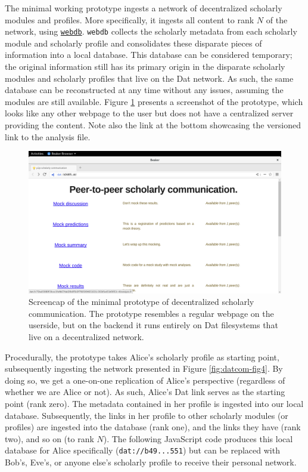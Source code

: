 \documentclass[publications,article,submit,moreauthors,pdftex,10pt,a4paper]{Definitions/mdpi}
\begin{document}
The minimal working prototype ingests a network of decentralized
scholarly modules and profiles. More specifically, it ingests all
content to rank \(N\) of the network, using
\href{https://github.com/beakerbrowser/webdb}{\texttt{webdb}}.
\texttt{webdb} collects the scholarly metadata from each scholarly
module and scholarly profile and consolidates these disparate pieces of
information into a local database. This database can be considered
temporary; the original information still has its primary origin in the
disparate scholarly modules and scholarly profiles that live on the Dat
network. As such, the same database can be reconstructed at any time
without any issues, assuming the modules are still available. Figure
\ref{fig:datcom-fig5} presents a screenshot of the prototype, which
looks like any other webpage to the user but does not have a centralized
server providing the content. Note also the link at the bottom
showcasing the versioned link to the analysis file.

\begin{figure}

{\centering \includegraphics[width=1\linewidth]{fig5} 

}

\caption{Screencap of the minimal prototype of decentralized scholarly communication. The prototype resembles a regular webpage on the userside, but on the backend it runs entirely on Dat filesystems that live on a decentralized network.}\label{fig:datcom-fig5}
\end{figure}

Procedurally, the prototype takes Alice's scholarly profile as starting
point, subsequently ingesting the network presented in Figure
\ref{fig:datcom-fig4}. By doing so, we get a one-on-one replication of
Alice's perspective (regardless of whether we are Alice or not). As
such, Alice's Dat link serves as the starting point (rank zero). The
metadata contained in her profile is ingested into our local database.
Subsequently, the links in her profile to other scholarly modules (or
profiles) are ingested into the database (rank one), and the links they
have (rank two), and so on (to rank \(N\)). The following JavaScript
code produces this local database for Alice specifically
(\texttt{dat://b49...551}) but can be replaced with Bob's, Eve's, or
anyone else's scholarly profile to receive their personal network.
\end{document}
